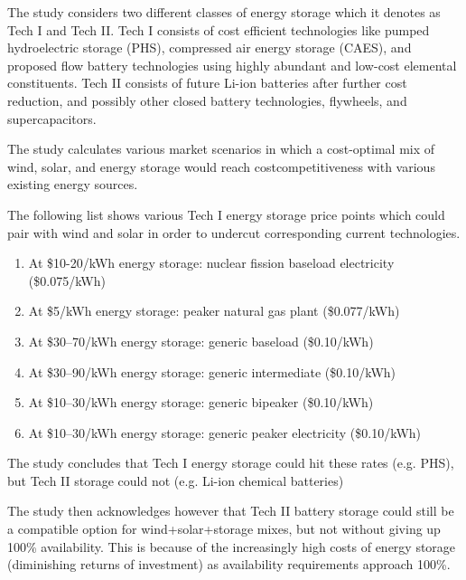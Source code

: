 \documentclass[hidelinks,12pt,a4paper]{article}
\begin{document}
The study considers two different classes of energy storage which it denotes as Tech I and Tech II. Tech I consists of cost efficient technologies like pumped hydroelectric storage (PHS), compressed air energy storage (CAES), and proposed flow battery technologies using highly abundant and low-cost elemental constituents. Tech II consists of future Li-ion batteries after further cost reduction, and possibly other closed battery technologies, flywheels, and supercapacitors. \cite{StorageRequirementsAndCostsOfShapingRenewableEnergy}

The study calculates various market scenarios in which a cost-optimal mix of wind, solar, and energy storage would reach costcompetitiveness with various existing energy sources.

The following list shows various Tech I energy storage price points which could pair with wind and solar in order to undercut corresponding current technologies.
{\footnotesize
\begin{enumerate}
    \item At \$10-20/kWh energy storage: nuclear fission baseload electricity (\$0.075/kWh)
    \item At \$5/kWh energy storage: peaker natural gas plant (\$0.077/kWh)
    \item At \$30–70/kWh energy storage: generic baseload (\$0.10/kWh)
    \item At \$30–90/kWh energy storage: generic intermediate (\$0.10/kWh)
    \item At \$10–30/kWh energy storage: generic bipeaker (\$0.10/kWh)
    \item At \$10–30/kWh energy storage: generic peaker electricity (\$0.10/kWh)
\end{enumerate}
}

The study concludes that Tech I energy storage could hit these rates (e.g. PHS), but Tech II storage could not (e.g. Li-ion chemical batteries)

The study then acknowledges however that Tech II battery storage could still be a compatible option for wind+solar+storage mixes, but not without giving up 100\% availability. This is because of the increasingly high costs of energy storage (diminishing returns of investment) as availability requirements approach 100\%.
\end{document}
